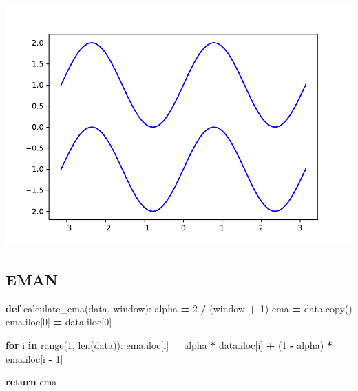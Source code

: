\documentclass[
]{article}
\newenvironment{Shaded}{\begin{snugshade}}{\end{snugshade}}
\newcommand{\BuiltInTok}[1]{#1}
\newcommand{\ControlFlowTok}[1]{\textcolor[rgb]{0.13,0.29,0.53}{\textbf{#1}}}
\newcommand{\DecValTok}[1]{\textcolor[rgb]{0.00,0.00,0.81}{#1}}
\newcommand{\KeywordTok}[1]{\textcolor[rgb]{0.13,0.29,0.53}{\textbf{#1}}}
\newcommand{\NormalTok}[1]{#1}
\newcommand{\OperatorTok}[1]{\textcolor[rgb]{0.81,0.36,0.00}{\textbf{#1}}}
\begin{document}
\includegraphics{macd_files/figure-latex/unnamed-chunk-2-1.pdf}

\subsection{EMAN}\label{eman}

\begin{Shaded}
\begin{Highlighting}[]
\KeywordTok{def}\NormalTok{ calculate\_ema(data, window):}
\NormalTok{    alpha }\OperatorTok{=} \DecValTok{2} \OperatorTok{/}\NormalTok{ (window }\OperatorTok{+} \DecValTok{1}\NormalTok{)}
\NormalTok{    ema }\OperatorTok{=}\NormalTok{ data.copy()}
\NormalTok{    ema.iloc[}\DecValTok{0}\NormalTok{] }\OperatorTok{=}\NormalTok{ data.iloc[}\DecValTok{0}\NormalTok{]}

    \ControlFlowTok{for}\NormalTok{ i }\KeywordTok{in} \BuiltInTok{range}\NormalTok{(}\DecValTok{1}\NormalTok{, }\BuiltInTok{len}\NormalTok{(data)):}
\NormalTok{        ema.iloc[i] }\OperatorTok{=}\NormalTok{ alpha }\OperatorTok{*}\NormalTok{ data.iloc[i] }\OperatorTok{+}\NormalTok{ (}\DecValTok{1} \OperatorTok{{-}}\NormalTok{ alpha) }\OperatorTok{*}\NormalTok{ ema.iloc[i }\OperatorTok{{-}} \DecValTok{1}\NormalTok{]}

    \ControlFlowTok{return}\NormalTok{ ema}
\end{Highlighting}
\end{Shaded}
\end{document}
